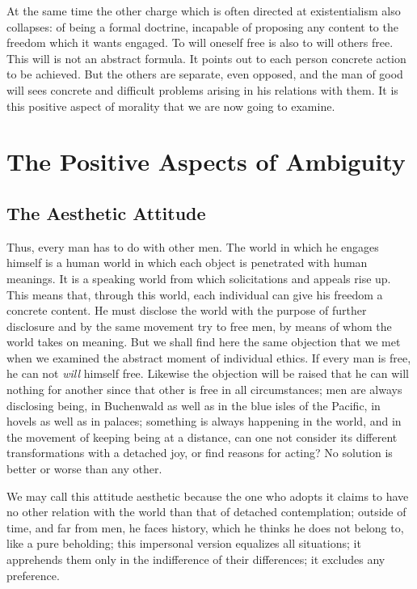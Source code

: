 \documentclass[11pt]{article}
\begin{document}
{{At the same time the other charge which is often directed at existentialism also collapses: of being a formal doctrine, incapable of proposing any content to the freedom which it wants engaged. To will oneself free is also to will others free. This will is not an abstract formula. It points out to each person concrete action to be achieved. But the others are separate, even opposed, and the man of good will sees concrete and difficult problems arising in his relations with them. It is this positive aspect of morality that we are now going to examine.
\pagebreak
\section{The Positive Aspects of Ambiguity}
\subsection{The Aesthetic Attitude}
Thus, every man has to do with other men. The world in which he engages himself is a human world in which each object is penetrated with human meanings. It is a speaking world from which solicitations and appeals rise up. This means that, through this world, each individual can give his freedom a concrete content. He must disclose the world with the purpose of further disclosure and by the same movement try to free men, by means of whom the world takes on meaning. But we shall find here the same objection that we met when we examined the abstract moment of individual ethics. If every man is free, he can not \textit{will} himself free. Likewise the objection will be raised that he can will nothing for another since that other is free in all circumstances; men are always disclosing being, in Buchenwald as well as in the blue isles of the Pacific, in hovels as well as in palaces; something is always happening in the world, and in the movement of keeping being at a distance, can one not consider its different transformations with a detached joy, or find reasons for acting? No solution is better or worse than any other.

We may call this attitude aesthetic because the one who adopts it claims to have no other relation with the world than that of detached contemplation; outside of time, and far from men, he faces history, which he thinks he does not belong to, like a pure beholding; this impersonal version equalizes all situations; it apprehends them only in the indifference of their differences; it excludes any preference.

}}
\end{document}
